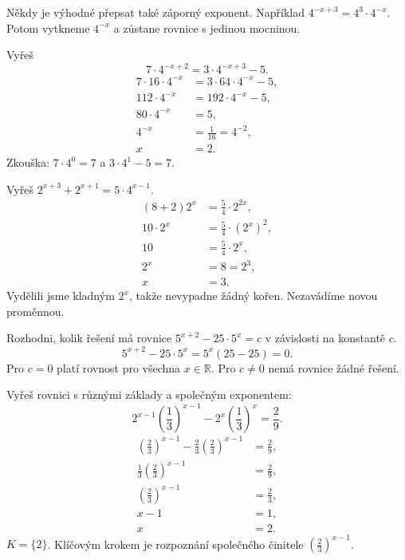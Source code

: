 \documentclass[11pt,a4paper]{article}
\begin{document}
Někdy je výhodné přepsat také záporný exponent. Například $4^{-x+3}=4^3\cdot4^{-x}$. Potom vytkneme $4^{-x}$ a zůstane rovnice s jedinou mocninou.
\begin{prikladReseniBox}[title={Příklad 4}]
Vyřeš
\[
7\cdot4^{-x+2}=3\cdot4^{-x+3}-5.
\]
\tcblower
\[
\begin{aligned}
7\cdot16\cdot4^{-x}&=3\cdot64\cdot4^{-x}-5,\\
112\cdot4^{-x}&=192\cdot4^{-x}-5,\\
80\cdot4^{-x}&=5,\\
4^{-x}&=\frac{1}{16}=4^{-2},\\
x&=2.
\end{aligned}
\]
Zkouška: $7\cdot4^0=7$ a $3\cdot4^1-5=7$.
\end{prikladReseniBox}
\begin{prikladReseniBox}[title={Příklad 5}]
Vyřeš $2^{x+3}+2^{x+1}=5\cdot4^{x-1}$.
\tcblower
\[
\begin{aligned}
(8+2)2^x&=\frac{5}{4}\cdot2^{2x},\\
10\cdot2^x&=\frac{5}{4}\cdot(2^x)^2,\\
10&=\frac{5}{4}\cdot2^x,\\
2^x&=8=2^3,\\
x&=3.
\end{aligned}
\]
Vydělili jsme kladným $2^x$, takže nevypadne žádný kořen. Nezavádíme novou proměnnou.
\end{prikladReseniBox}
\begin{prikladReseniBox}[title={Příklad 6}]
Rozhodni, kolik řešení má rovnice $5^{x+2}-25\cdot5^x=c$ v závislosti na konstantě $c$.
\tcblower
\[
5^{x+2}-25\cdot5^x=5^x(25-25)=0.
\]
Pro $c=0$ platí rovnost pro všechna $x\in\mathbb R$. Pro $c\ne0$ nemá rovnice žádné řešení.
\end{prikladReseniBox}

\begin{prikladReseniBox}[title={Příklad 7}]
Vyřeš rovnici s různými základy a společným exponentem:
\[
2^{x-1}\left(\frac{1}{3}\right)^{x-1}-2^x\left(\frac{1}{3}\right)^x=\frac{2}{9}.
\]
\tcblower
\[
\begin{aligned}
\left(\frac{2}{3}\right)^{x-1}-\frac{2}{3}\left(\frac{2}{3}\right)^{x-1}&=\frac{2}{9},\\
\frac{1}{3}\left(\frac{2}{3}\right)^{x-1}&=\frac{2}{9},\\
\left(\frac{2}{3}\right)^{x-1}&=\frac{2}{3},\\
x-1&=1,\\
x&=2.
\end{aligned}
\]
$K=\{2\}$. Klíčovým krokem je rozpoznání společného činitele $\left(\frac{2}{3}\right)^{x-1}$.
\end{prikladReseniBox}
\end{document}
